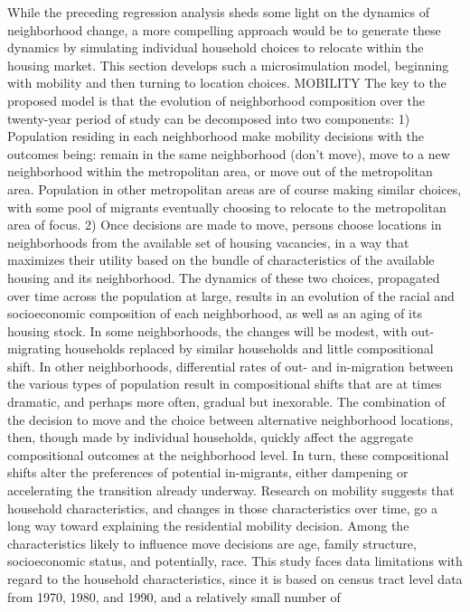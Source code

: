 \documentclass[12pt,a4paper]{article}
\begin{document}
While the preceding regression analysis sheds some light on the
dynamics of neighborhood change, a more compelling approach would
be to generate these dynamics by simulating individual household
choices to relocate within the housing market.  This section
develops such a microsimulation model, beginning with mobility and
then turning to location choices. MOBILITY The key to the proposed
model is that the evolution of neighborhood composition over the
twenty-year period of study can be decomposed into two components:
1)  Population residing in each neighborhood make mobility
decisions with the outcomes being: remain in the same neighborhood
(don't move), move to a new neighborhood within the metropolitan
area, or move out of the metropolitan area.  Population in other
metropolitan areas are of course making similar choices, with some
pool of migrants eventually choosing to relocate to the
metropolitan area of focus. 2)  Once decisions are made to move,
persons choose locations in neighborhoods from the available set
of housing vacancies, in a way that maximizes their utility based
on the bundle of characteristics of the available housing and its
neighborhood. The dynamics of these two choices, propagated over
time across the population at large, results in an evolution of
the racial and socioeconomic composition of each neighborhood, as
well as an aging of its housing stock.  In some neighborhoods, the
changes will be modest, with out-migrating households replaced by
similar households and little compositional shift.  In other
neighborhoods, differential rates of out- and in-migration between
the various types of population result in compositional shifts
that are at times dramatic, and perhaps more often, gradual but
inexorable.  The combination of the decision to move and the
choice between alternative neighborhood locations, then, though
made by individual households, quickly affect the aggregate
compositional outcomes at the neighborhood level.  In turn, these
compositional shifts alter the preferences of potential
in-migrants, either dampening or accelerating the transition
already underway. Research on mobility suggests that household
characteristics, and changes in those characteristics over time,
go a long way toward explaining the residential mobility decision.
Among the characteristics likely to influence move decisions are
age, family structure, socioeconomic status, and potentially,
race.  This study faces data limitations with regard to the
household characteristics, since it is based on census tract level
data from 1970, 1980, and 1990, and a relatively small number of
\end{document}
